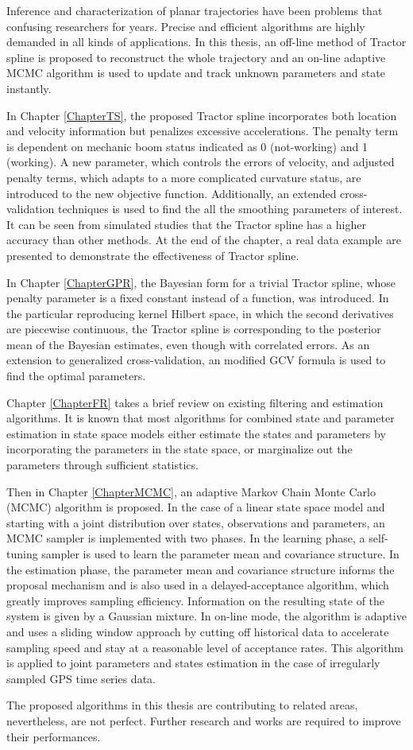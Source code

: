 

Inference and characterization of planar trajectories have been problems that confusing researchers for years. Precise and efficient algorithms are highly demanded in all kinds of applications. In this thesis, an off-line method of Tractor spline is proposed to reconstruct the whole trajectory and an on-line adaptive MCMC algorithm is used to update and track unknown parameters and state instantly. 

In Chapter \ref{ChapterTS}, the proposed Tractor spline incorporates both location and velocity information but penalizes excessive accelerations. The penalty term is dependent on mechanic boom status indicated as 0 (not-working) and 1 (working). A new parameter, which controls the errors of velocity, and adjusted penalty terms, which adapts to a more complicated curvature status, are introduced to the new objective function. Additionally, an extended cross-validation techniques is used to find the all the smoothing parameters of interest. It can be seen from simulated studies that the Tractor spline has a higher accuracy than other methods. At the end of the chapter, a real data example are presented to demonstrate the effectiveness of Tractor spline.


In Chapter \ref{ChapterGPR}, the Bayesian form for a trivial Tractor spline, whose penalty parameter is a fixed constant instead of a function, was introduced. In the particular reproducing kernel Hilbert space, in which the second derivatives are piecewise continuous, the Tractor spline is corresponding to the posterior mean of the Bayesian estimates, even though with correlated errors. As an extension to generalized cross-validation, an modified GCV formula is used to find the optimal parameters. 


Chapter \ref{ChapterFR} takes a brief review on existing filtering and estimation algorithms. It is known that most algorithms for combined state and parameter estimation in state space models either estimate the states and parameters by incorporating the parameters in the state space, or marginalize out the parameters through sufficient statistics. 

Then in Chapter \ref{ChapterMCMC}, an adaptive Markov Chain Monte Carlo (MCMC) algorithm is proposed. In the case of a linear state space model and starting with a joint distribution over states, observations and parameters, an MCMC sampler is implemented with two phases. In the learning phase, a self-tuning sampler is used to learn the parameter mean and covariance structure. In the estimation phase, the parameter mean and covariance structure informs the proposal mechanism and is also used in a delayed-acceptance algorithm, which greatly improves sampling efficiency. Information on the resulting state of the system is given by a Gaussian mixture. In on-line mode, the algorithm is adaptive and uses a sliding window approach by cutting off historical data to accelerate sampling speed and stay at a reasonable level of acceptance rates. This algorithm is applied to joint parameters and states estimation in the case of irregularly sampled GPS time series data. 



The proposed algorithms in this thesis are contributing to related areas, nevertheless, are not perfect. Further research and works are required to improve their performances. 








